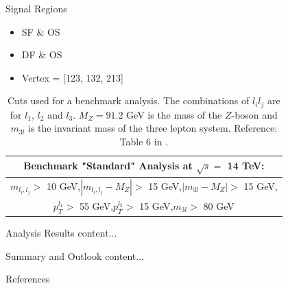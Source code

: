 \documentclass[notes]{beamer}
\begin{document}
	\begin{frame}[t]{Signal Regions}
		\begin{itemize}
			\item SF \& OS
			\item DF \& OS
			\item Vertex = [123, 132, 213]
		\end{itemize}
	
		\begin{table}[ht!]
			\centering
			\begin{tabular}{|c|}
				\hline \rule{0pt}{13pt}
				\textbf{Benchmark "Standard" Analysis at $\sqrt{s}=$ 14 TeV:}\\
				\hline \rule{0pt}{13pt}
				$m_{l_i,l_j}>$ 10 GeV,\quad $|m_{l_i,l_j}-M_Z|>$ 15 GeV,\quad $|m_{3l}-M_Z|>$ 15 GeV,\\
				$p_T^{l_1}>$ 55 GeV,\quad $p_T^{l_2}>$ 15 GeV,\quad $m_{3l}>$ 80 GeV\\
				\hline
			\end{tabular}
			\caption{Cuts used for a benchmark analysis. The combinations of $l_il_j$ are for $l_1$, $l_2$ and $l_3$. $M_Z=91.2$ GeV is the mass of the $Z$-boson and $m_{3l}$ is the invariant mass of the three lepton system. Reference: Table 6 in \citet{inverseseesaw}.}
			\label{tab:Cuts_Benchmark}
		\end{table}
	\end{frame}


	\begin{frame}[t]{Analysis Results}
		content...
	\end{frame}


	\begin{frame}[t]{Summary and Outlook}
		content...
	\end{frame}

	
	\begin{frame}[t]{References}
		
	\end{frame}
\end{document}
